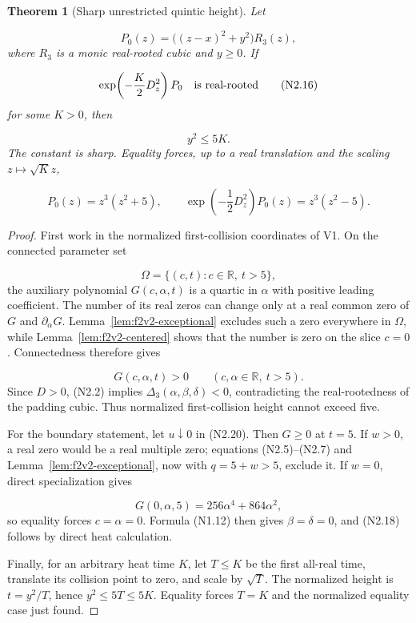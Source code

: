 \documentclass[11pt]{article}
\newtheorem{theorem}{Theorem}[section]
\theoremstyle{definition}
\theoremstyle{remark}
\begin{document}
\begin{theorem}[Sharp unrestricted quintic height]
\label{thm:f2v2-quintic}
Let

\[
 P_0(z)=\bigl((z-x)^2+y^2\bigr)R_3(z),
 \tag{N2.15}
\]
where \(R_3\) is a monic real-rooted cubic and \(y\ge0\).  If

\[
 \exp\!\left(-\frac K2D_z^2\right)P_0
 \quad\hbox{is real-rooted}
 \tag{N2.16}
\]
for some \(K>0\), then

\[
 \boxed{y^2\le5K.}
 \tag{N2.17}
\]
The constant is sharp.  Equality forces, up to a real translation and
the scaling \(z\mapsto\sqrt K z\),

\[
 P_0(z)=z^3(z^2+5),
 \qquad
 \exp\!\left(-\frac12D_z^2\right)P_0(z)
 =z^3(z^2-5).
 \tag{N2.18}
\]
\end{theorem}

\begin{proof}
First work in the normalized first-collision coordinates of V1.  On the
connected parameter set

\[
 \Omega=\{(c,t):c\in\mathbb R,\ t>5\},
 \tag{N2.19}
\]
the auxiliary polynomial \(G(c,\alpha,t)\) is a quartic in \(\alpha\)
with positive leading coefficient.  The number of its real zeros can
change only at a real common zero of \(G\) and
\(\partial_\alpha G\).  Lemma~\ref{lem:f2v2-exceptional} excludes such a
zero everywhere in \(\Omega\), while
Lemma~\ref{lem:f2v2-centered} shows that the number is zero on the slice
\(c=0\).  Connectedness therefore gives

\[
 G(c,\alpha,t)>0
 \qquad(c,\alpha\in\mathbb R,\ t>5).
 \tag{N2.20}
\]
Since \(D>0\), \textup{(N2.2)} implies
\(\Delta_3(\alpha,\beta,\delta)<0\), contradicting the real-rootedness
of the padding cubic.  Thus normalized first-collision height cannot
exceed five.

For the boundary statement, let \(u\downarrow0\) in
\textup{(N2.20)}.  Then \(G\ge0\) at \(t=5\).  If \(w>0\), a real zero
would be a real multiple zero; equations \textup{(N2.5)}--\textup{(N2.7)}
and Lemma~\ref{lem:f2v2-exceptional}, now with \(q=5+w>5\), exclude it.
If \(w=0\), direct specialization gives

\[
 G(0,\alpha,5)=256\alpha^4+864\alpha^2,
 \tag{N2.21}
\]
so equality forces \(c=\alpha=0\).  Formula \textup{(N1.12)} then gives
\(\beta=\delta=0\), and \textup{(N2.18)} follows by direct heat
calculation.

Finally, for an arbitrary heat time \(K\), let \(T\le K\) be the first
all-real time, translate its collision point to zero, and scale by
\(\sqrt T\).  The normalized height is \(t=y^2/T\), hence \(y^2\le5T\le
5K\).  Equality forces \(T=K\) and the normalized equality case just
found.
\end{proof}
\end{document}
